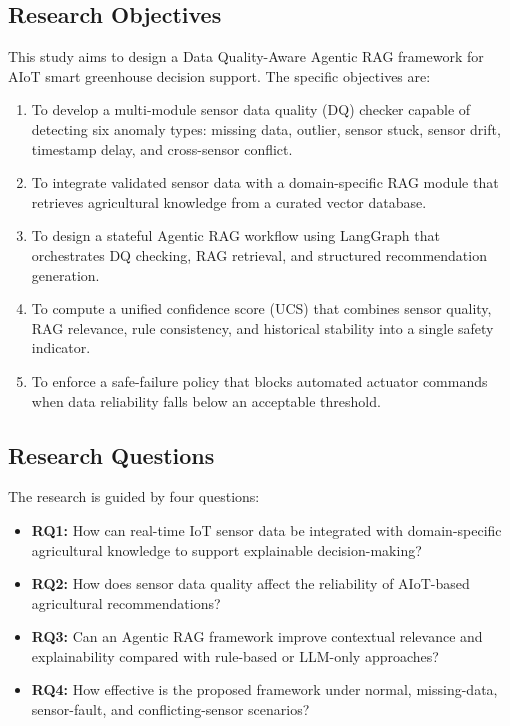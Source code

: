 \documentclass[runningheads]{llncs}
\begin{document}
\subsection{Research Objectives}
This study aims to design a Data Quality-Aware Agentic RAG framework for AIoT smart greenhouse decision support. The specific objectives are:
\begin{enumerate}
    \item To develop a multi-module sensor data quality (DQ) checker capable of detecting six anomaly types: missing data, outlier, sensor stuck, sensor drift, timestamp delay, and cross-sensor conflict.
    \item To integrate validated sensor data with a domain-specific RAG module that retrieves agricultural knowledge from a curated vector database.
    \item To design a stateful Agentic RAG workflow using LangGraph that orchestrates DQ checking, RAG retrieval, and structured recommendation generation.
    \item To compute a unified confidence score (UCS) that combines sensor quality, RAG relevance, rule consistency, and historical stability into a single safety indicator.
    \item To enforce a safe-failure policy that blocks automated actuator commands when data reliability falls below an acceptable threshold.
\end{enumerate}

\subsection{Research Questions}
The research is guided by four questions:
\begin{itemize}
    \item \textbf{RQ1:} How can real-time IoT sensor data be integrated with domain-specific agricultural knowledge to support explainable decision-making?
    \item \textbf{RQ2:} How does sensor data quality affect the reliability of AIoT-based agricultural recommendations?
    \item \textbf{RQ3:} Can an Agentic RAG framework improve contextual relevance and explainability compared with rule-based or LLM-only approaches?
    \item \textbf{RQ4:} How effective is the proposed framework under normal, missing-data, sensor-fault, and conflicting-sensor scenarios?
\end{itemize}
\end{document}
